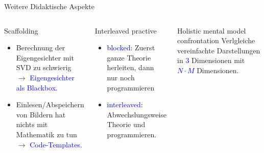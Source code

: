 \documentclass[10pt,aspectratio=169]{beamer}
\begin{document}
\begin{frame}[fragile]{Weitere Didaktische Aspekte}
	\begin{columns}[T,onlytextwidth]
		\column{\textwidth}
		\begin{block}{Scaffolding}
			\begin{itemize}
				\item Berechnung der Eigengesichter mit SVD zu schwierig $\rightarrow$ \textcolor{blue}{Eigengesichter als Blackbox}.
				\item Einlesen/Abspeichern von Bildern hat nichts mit Mathematik zu tun $\rightarrow$ \textcolor{blue}{Code-Templates}.
			\end{itemize}
		\end{block}
		\begin{block}{Interleaved practive}
			\begin{itemize}
				\item \textcolor{blue}{blocked}: Zuerst ganze Theorie herleiten, dann nur noch programmieren
				\item \textcolor{blue}{interleaved}: Abwechslungsweise Theorie und programmieren.
			\end{itemize}
		\end{block}
		\begin{block}{Holistic mental model confrontation}
			Verlgleiche vereinfachte Darstellungen in \textcolor{blue}{3} Dimensionen mit \textcolor{blue}{$N\cdot M$} Dimensionen.
		\end{block}
	\end{columns}
\end{frame}
	
\end{document}
